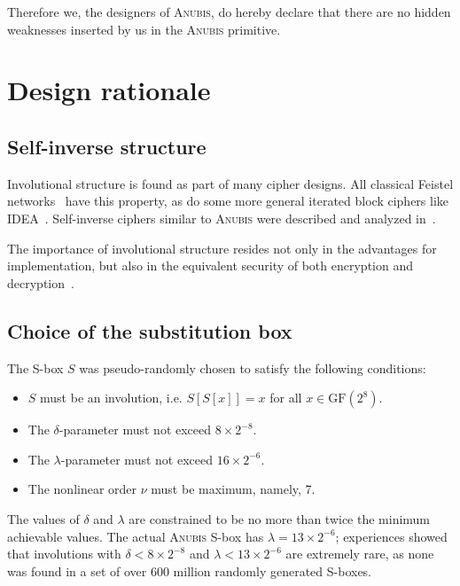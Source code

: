 \documentclass{llncs}
\newcommand{\GF}{\mathrm{GF}}
\begin{document}
Therefore we, the designers of \textsc{Anubis}, do hereby declare
that there are no hidden weaknesses inserted by us in the
\textsc{Anubis} primitive.

\section{Design rationale}\label{rationale}

\subsection{Self-inverse structure}

Involutional structure is found as part of many cipher designs.
All classical Feistel networks~\cite{feistel} have this property,
as do some more general iterated block ciphers like
IDEA~\cite{idea}. Self-inverse ciphers similar to \textsc{Anubis}
were described and analyzed
in~\cite{youssef-tavares-heys,youssef-mister-tavares}.

The importance of involutional structure resides not only in the
advantages for implementation, but also in the equivalent
security of both encryption and decryption~\cite{knudsen-wagner}.

\subsection{Choice of the substitution box}\label{sbox-crit}

The S-box $S$ was pseudo-randomly chosen to satisfy the following
conditions:
\begin{itemize}
\item $S$ must be an involution, i.e. $S[S[x]] = x$ for all $x \in
\GF(2^8)$.
\item The $\delta$-parameter must not exceed $8 \times 2^{-8}$.
\item The $\lambda$-parameter must not exceed $16 \times 2^{-6}$.
\item The nonlinear order $\nu$ must be maximum, namely, 7.
\end{itemize}

The values of $\delta$ and $\lambda$ are constrained to be no
more than twice the minimum achievable values. The actual
\textsc{Anubis} S-box has $\lambda = 13 \times 2^{-6}$;
experiences showed that involutions with $\delta < 8 \times
2^{-8}$ and $\lambda < 13 \times 2^{-6}$ are extremely rare, as
none was found in a set of over 600 million randomly generated
S-boxes.
\end{document}
